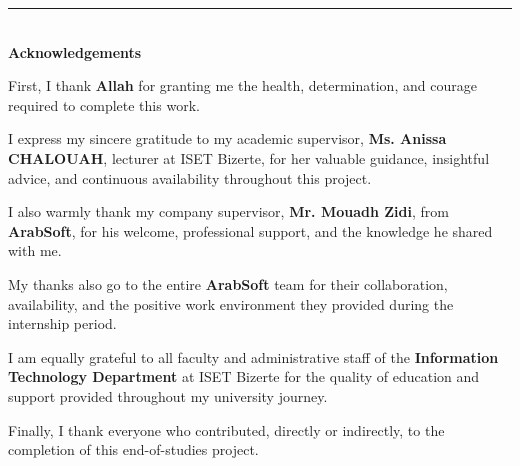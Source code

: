 ﻿%

\newpage
\thispagestyle{empty}

\begin{center}
  \rule{\linewidth}{1.2pt}\\[0.4cm]
  {\fontsize{20}{24}\selectfont \textbf{Acknowledgements}}\\[0.5cm]
\end{center}

{\fontsize{12}{16}\selectfont
\setlength{\parindent}{1.2cm}
\setlength{\parskip}{6pt}

\noindent\justify

\indent First, I thank \textbf{Allah} for granting me the health, determination, and courage required to complete this work.

\indent I express my sincere gratitude to my academic supervisor, \textbf{Ms. Anissa CHALOUAH}, lecturer at ISET Bizerte, for her valuable guidance, insightful advice, and continuous availability throughout this project.

\indent I also warmly thank my company supervisor, \textbf{Mr. Mouadh Zidi}, from \textbf{ArabSoft}, for his welcome, professional support, and the knowledge he shared with me.

\indent My thanks also go to the entire \textbf{ArabSoft} team for their collaboration, availability, and the positive work environment they provided during the internship period.

\indent I am equally grateful to all faculty and administrative staff of the \textbf{Information Technology Department} at ISET Bizerte for the quality of education and support provided throughout my university journey.

\indent Finally, I thank everyone who contributed, directly or indirectly, to the completion of this end-of-studies project.

}

